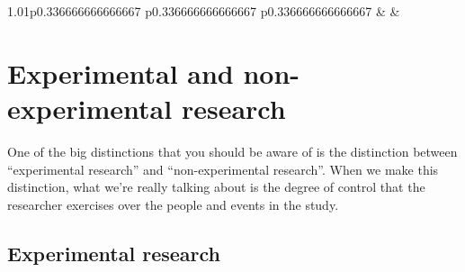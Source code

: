\documentclass[
]{book}
\begin{document}
\begin{table}[ht]
\begin{centerbox}
\begin{threeparttable}
\begin{tabularx}{1.01\textwidth}{p{} p{} p{}}
 &
 &
 \tabularnewline[-0.5pt]


\end{tabularx}\captionsetup{justification=raggedright,singlelinecheck=off}
\caption{\label{tab:tab2-5} Variable distinctions}
 
\end{threeparttable}\par\end{centerbox}

\end{table}
 

\hypertarget{experimental-and-non-experimental-research}{%
\section{Experimental and non-experimental research}\label{experimental-and-non-experimental-research}}

One of the big distinctions that you should be aware of is the distinction between ``experimental research'' and ``non-experimental research''. When we make this distinction, what we're really talking about is the degree of control that the researcher exercises over the people and events in the study.

\hypertarget{experimental-research}{%
\subsection{Experimental research}\label{experimental-research}}
\end{document}

